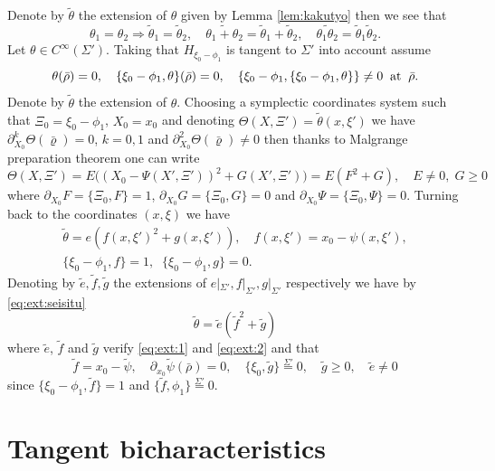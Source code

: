 \documentclass[12pt,leqno]{article} %
\def\dif{\partial}
\def\sieq{\overset{\Sigma'}{=}}
\def\bro{\bar\rho}
\def\bro{\bar\rho}
\numberwithin{equation}{section}
\begin{document}
Denote by $\tilde\theta$ the extension of $\theta$ given by Lemma \ref{lem:kakutyo} then we see that
%
\begin{equation}
\label{eq:ext:seisitu}
\theta_1=\theta_2\Longrightarrow \tilde\theta_1=\tilde\theta_2,\quad \widetilde{\theta_1+\theta_2}=\tilde\theta_1+\tilde\theta_2,\quad \widetilde{\theta_1\theta_2}=\tilde\theta_1\tilde\theta_2.
\end{equation}
%
Let $\theta\in C^{\infty}(\Sigma')$. Taking that $H_{\xi_0-\phi_1}$ is tangent to $\Sigma'$ into account assume 
%
\begin{equation}
\label{eq:2:bibun}
\theta(\bro)=0,\quad \{\xi_0-\phi_1,\theta\}(\bro)=0,\quad \{\xi_0-\phi_1,\{\xi_0-\phi_1,\theta\}\}\neq0\;\; {\rm at}\;\;\bro.
\end{equation}
%
Denote by $\tilde \theta$ the extension of $\theta$.  Choosing a symplectic coordinates system such that $\Xi_0=\xi_0-\phi_1$, $X_0=x_0$ and denoting $\Theta(X,\Xi')=\tilde\theta(x,\xi')$ we have $\dif_{X_0}^k\Theta (\bar\varrho)=0$, $k=0,1$ and $\dif_{X_0}^2\Theta (\bar\varrho)\neq 0$ then thanks to Malgrange preparation theorem one can write
%
\[
\Theta(X,\Xi')=E\big((X_0-\Psi(X',\Xi'))^2+G(X',\Xi')\big)=E(F^2+G),\quad E\neq 0,\;G\geq 0
\]
%
where $\dif_{X_0}F=\{\Xi_0, F\}=1$, $\dif_{X_0}G=\{\Xi_0, G\}=0$ and $\dif_{X_0}\Psi=\{\Xi_0, \Psi\}=0$. Turning back to the coordinates $(x,\xi)$ we have
%
\begin{gather*}
\tilde\theta= e( f(x,\xi')^2+ g(x,\xi')),\quad f(x,\xi')=x_0-\psi(x,\xi'),\\
 \{\xi_0-\phi_1,  f\}=1,\;\;\{\xi_0-\phi_1, g\}=0.
\end{gather*}
%
Denoting by $\tilde e, \tilde f,\tilde g$ the extensions of  $e|_{\Sigma'}, f|_{\Sigma'}, g|_{\Sigma'}$ respectively we have by \eqref{eq:ext:seisitu} 
%
\[
{\tilde\theta}=\tilde e(\tilde f^2+\tilde g)
\]
%
where $\tilde e$, $\tilde f$ and $\tilde g$ verify \eqref{eq:ext:1} and \eqref{eq:ext:2} and that 
%
\[
\tilde f=x_0-\tilde\psi,\quad \dif_{x_0}\tilde\psi(\bro)=0,\quad \{\xi_0,\tilde g\}\sieq 0,\quad \tilde g\geq 0,\quad \tilde e\neq 0
\]
%
since $\{\xi_0-\phi_1,\tilde f\}=1$ and $\{\tilde f,\phi_1\}\sieq 0$.
%
%
%
\

\section{Tangent bicharacteristics}
\label{tanbich}
\end{document}
